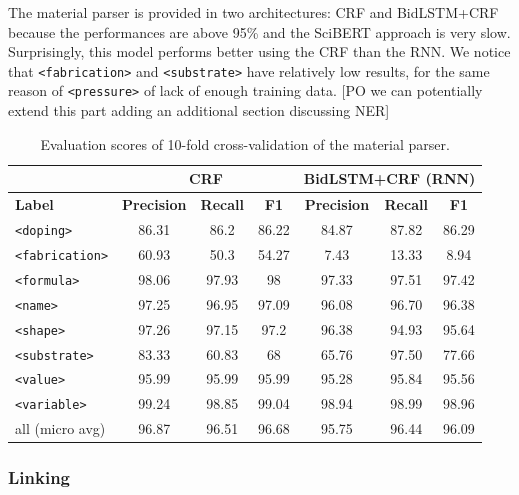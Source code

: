 \documentclass{article}
\begin{document}
The material parser is provided in two architectures: CRF and BidLSTM+CRF because the performances are above 95\% and the SciBERT approach is very slow. 
Surprisingly, this model performs better using the CRF than the RNN. We notice that \texttt{<fabrication>} and \texttt{<substrate>} have relatively low results, for the same reason of \texttt{<pressure>} of lack of enough training data.
[PO we can potentially extend this part adding an additional section discussing NER]

\begin{table}[ht]
\centering
\begin{tabular}{l|ccc|ccc}
& \multicolumn{3}{c}{\textbf{CRF}} & \multicolumn{3}{c}{\textbf{BidLSTM+CRF} (RNN)}\\ 
\hline \textbf{Label} & \textbf{Precision} & \textbf{Recall} & \textbf{F1} & \textbf{Precision} & \textbf{Recall} & \textbf{F1} \\ \hline

\texttt{<doping>}      & 86.31   & 86.2     & 86.22 & 84.87 &  87.82 & 86.29   \\
\texttt{<fabrication>} & 60.93   & 50.3     & 54.27 & 7.43  &  13.33 & 8.94   \\
\texttt{<formula>}     & 98.06   & 97.93    & 98    & 97.33 &  97.51 & 97.42  \\
\texttt{<name>}        & 97.25   & 96.95    & 97.09 & 96.08 &  96.70 & 96.38  \\
\texttt{<shape>}       & 97.26   & 97.15    & 97.2  & 96.38 &  94.93 & 95.64  \\
\texttt{<substrate>}   & 83.33   & 60.83    & 68    & 65.76 &  97.50 & 77.66  \\
\texttt{<value>}       & 95.99   & 95.99    & 95.99 & 95.28 &  95.84 & 95.56  \\
\texttt{<variable>}    & 99.24   & 98.85    & 99.04 & 98.94 &  98.99 & 98.96  \\
\hline
all  (micro avg)       & 96.87   & 96.51    & 96.68  & 95.75 &   96.44  &  96.09  \\
\hline
\end{tabular}
\caption{\label{tab:evaluation-10fold-material-parser} Evaluation scores of 10-fold cross-validation of the material parser. }
\end{table}


\subsubsection{Linking}
\end{document}
